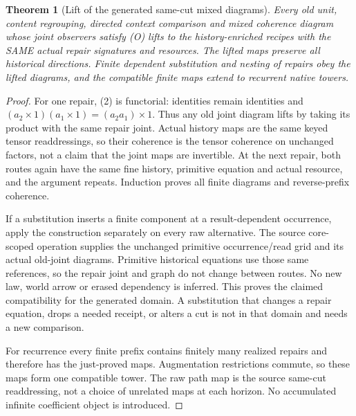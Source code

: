 \documentclass{article}
\newtheorem{theorem}{Theorem}\newtheorem{proposition}{Proposition}
\begin{document}
\begin{theorem}[Lift of the generated same-cut mixed diagrams]
Every old unit, content regrouping, directed context comparison and mixed coherence diagram whose joint observers satisfy (O) lifts to the history-enriched recipes with the SAME actual repair signatures and resources. The lifted maps preserve all historical directions. Finite dependent substitution and nesting of repairs obey the lifted diagrams, and the compatible finite maps extend to recurrent native towers.
\end{theorem}
\begin{proof}
For one repair, (2) is functorial: identities remain identities and $(a_2\times1)(a_1\times1)=(a_2a_1)\times1$. Thus any old joint diagram lifts by taking its product with the same repair joint. Actual history maps are the same keyed tensor readdressings, so their coherence is the tensor coherence on unchanged factors, not a claim that the joint maps are invertible. At the next repair, both routes again have the same fine history, primitive equation and actual resource, and the argument repeats. Induction proves all finite diagrams and reverse-prefix coherence.

If a substitution inserts a finite component at a result-dependent occurrence, apply the construction separately on every raw alternative. The source core-scoped operation supplies the unchanged primitive occurrence/read grid and its actual old-joint diagrams. Primitive historical equations use those same references, so the repair joint and graph do not change between routes. No new law, world arrow or erased dependency is inferred. This proves the claimed compatibility for the generated domain. A substitution that changes a repair equation, drops a needed receipt, or alters a cut is not in that domain and needs a new comparison.

For recurrence every finite prefix contains finitely many realized repairs and therefore has the just-proved maps. Augmentation restrictions commute, so these maps form one compatible tower. The raw path map is the source same-cut readdressing, not a choice of unrelated maps at each horizon. No accumulated infinite coefficient object is introduced.\end{proof}
\end{document}
